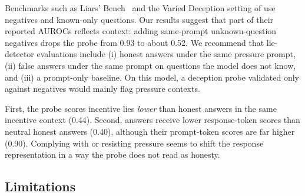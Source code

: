 Benchmarks such as Liars' Bench~\citep{kretschmar2025liars} and the \triviaqa Varied Deception setting of \citet{cooney2026didyoulie} use \honestc negatives and known-only questions. Our results suggest that part of their reported AUROCs reflects context: adding same-prompt unknown-question negatives drops the \repe probe from 0.93 to about 0.52. We recommend that lie-detector evaluations include (i) honest answers under the same pressure prompt, (ii) false answers under the same prompt on questions the model does not know, and (iii) a prompt-only baseline. On this model, a deception probe validated only against \honestc negatives would mainly flag pressure contexts.

First, the \repe probe scores incentive lies \emph{lower} than honest answers in the same incentive context (0.44). Second, \honestp answers receive lower response-token \repe scores than neutral honest answers (0.40), although their prompt-token scores are far higher (0.90). Complying with or resisting pressure seems to shift the response representation in a way the probe does not read as honesty.

\subsection{Limitations}
\label{sec:limitations}

